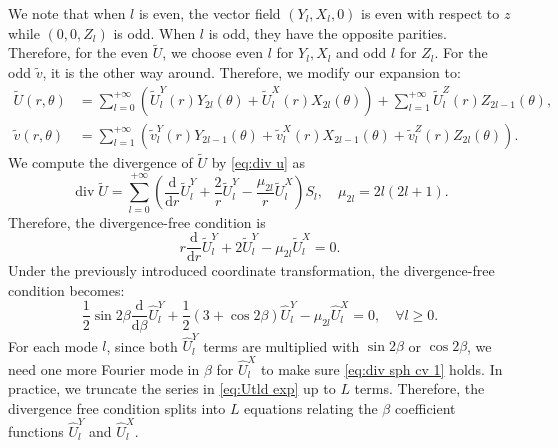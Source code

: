 \documentclass[11pt,a4paper]{article}
\numberwithin{equation}{section}
\newcommand{\mathd}{\mathrm{d}}
\newcommand{\tmop}[1]{\ensuremath{\operatorname{#1}}}
\begin{document}
We note that when $l$ is even, the vector field $(Y_l, X_l, 0)$ is even with
respect to $z$ while $(0, 0, Z_l)$ is odd. When $l$ is odd, they have the
opposite parities. Therefore, for the even $\widetilde{U}$, we choose even $l$ for
$Y_l, X_l$ and odd $l$ for $Z_l$. For the odd $\widetilde{v}$, it is the other way
around. Therefore, we modify our expansion to:
\begin{align}
  \widetilde{U} (r, \theta) & = \sum_{l = 0}^{+ \infty} (\widetilde{U}_l^Y (r) Y_{2
  l} (\theta) + \widetilde{U}_l^X (r) X_{2 l} (\theta)) + \sum_{l = 1}^{+ \infty}
  \widetilde{U}_l^Z (r) Z_{2 l - 1} (\theta),  \label{eq:Utld exp}\\
  \widetilde{v} (r, \theta) & = \sum_{l = 1}^{+ \infty} (\widetilde{v}_l^Y (r) Y_{2
  l - 1} (\theta) + \widetilde{v}_l^X (r) X_{2 l - 1} (\theta) + \widetilde{v}_l^Z (r)
  Z_{2 l} (\theta)) . \nonumber
\end{align}  We compute
the divergence of $\widetilde{U}$ by \eqref{eq:div u} as
\[ \tmop{div} \widetilde{U} = \sum_{l = 0}^{+ \infty} \left( \frac{\mathd}{\mathd
   r}  \widetilde{U}_l^Y + \frac{2}{r}  \widetilde{U}_l^Y - \frac{\mu_{2 l}}{r} 
   \widetilde{U}_l^X \right) S_l, \quad \mu_{2 l} = 2 l (2 l + 1) . \]
Therefore, the divergence-free condition is
\[ r \frac{\mathd}{\mathd r}  \widetilde{U}_l^Y + 2 \widetilde{U}_l^Y - \mu_{2 l} 
   \widetilde{U}_l^X = 0. \]
Under the previously introduced coordinate transformation, the divergence-free
condition becomes:
\begin{equation}
  \frac{1}{2} \sin 2 \beta \frac{\mathd}{\mathd \beta}  \widehat{U}_l^Y +
  \frac{1}{2}  (3 + \cos 2 \beta)  \widehat{U}_l^Y - \mu_{2 l}  \widehat{U}_l^X = 0,\quad \forall l\geqslant0.
  \label{eq:div sph cv 1}
\end{equation}
For each mode $l$, since both $\widehat{U}_l^Y$ terms are multiplied with $\sin 2 \beta$ or $\cos 2 \beta$, we need one more Fourier mode in $\beta$ for $\widehat{U}_l^X$ to make sure \eqref{eq:div sph cv 1} holds. In practice, we truncate the series in \eqref{eq:Utld exp} up to $L$ terms. Therefore, the divergence
free condition splits into $L$ equations relating the $\beta$ coefficient
functions $\widehat{U}_l^Y$ and $\widehat{U}_l^X$.
\end{document}

